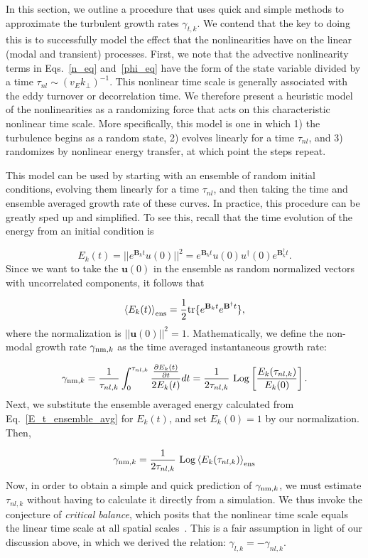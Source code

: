\documentclass[letter,scriptaddress,twocolumn, prl,showkeys]{revtex4}
\def\beq{\begin{equation}}
\def\eeq{\end{equation}}
\newcommand{\pdiff}[2]{\frac{\partial#1}{\partial#2}}
\begin{document}
In this section, we outline a procedure that uses quick and simple methods to approximate the turbulent growth rates $\gamma_{t,k}$.
We contend that the key to doing this is to successfully model the effect that the nonlinearities have on the linear (modal and transient) processes.
First, we note that the advective nonlinearity terms in Eqs.~\ref{n_eq} and~\ref{phi_eq} have the form of the state variable divided by a time $\tau_{nl} \sim (v_E k_\perp)^{-1}$. 
This nonlinear time scale is generally associated with the eddy turnover or decorrelation time. We therefore present a heuristic model of the nonlinearities 
as a randomizing force that acts on this characteristic nonlinear time scale. More specifically, this model is one in which 1) the turbulence begins as a random state, 
2) evolves linearly for a time $\tau_{nl}$, and 3) randomizes by nonlinear energy transfer, at which point the steps repeat.

This model can be used by starting with an ensemble of random initial conditions, evolving them linearly for a time $\tau_{nl}$, and
then taking the time and ensemble averaged growth rate of these curves.
In practice, this procedure can be greatly sped up and simplified. To see this, recall that the time evolution of the energy from an initial condition is

\beq
\label{E_t_from_u0}
E_k(t) = ||e^{\mathbf{B}_k t} u(0)||^2 = e^{\mathbf{B}_k t} u(0) u^{\dagger}(0) e^{\mathbf{B}_k^{\dagger}t}.
\eeq
Since we want to take the $\mathbf{u}(0)$ in the ensemble as random normalized vectors with uncorrelated components, it follows that~\cite{camargo1998}

\beq
\label{E_t_ensemble_avg}
\left< E_k(t) \right>_{{\rm{ens}}} = \frac{1}{2} {\rm{tr}} \{ e^{\mathbf{B}_k t} e^{\mathbf{B}^{\dagger}t} \},
\eeq
where the normalization is $||\mathbf{u}(0)||^2 = 1$. Mathematically, we define the non-modal growth rate $\gamma_{{\rm{nm}},k}$ as the time averaged instantaneous growth rate:

\beq
\label{gamma_nm_calc}
\gamma_{{\rm{nm}},k} = \frac{1}{\tau_{nl,k}} \int_0^{\tau_{nl,k}} \frac{\pdiff{E_k(t)}{t}}{2 E_k(t)} dt = \frac{1}{2 \tau_{nl,k}} \ {\rm{Log}} \left[ \frac{E_k(\tau_{nl,k})}{E_k(0)}\right].
\eeq
Next, we substitute the ensemble averaged energy calculated from Eq.~\ref{E_t_ensemble_avg} for $E_k(t)$, and set $E_k(0) = 1$ by our normalization. Then,

\beq
\label{gamma_nm}
\gamma_{{\rm{nm}},k} = \frac{1}{2 \tau_{nl,k}} \ {\rm{Log}} \left<  E_k(\tau_{nl,k}) \right>_{\rm{ens}}
\eeq
Now, in order to obtain a simple and quick prediction of $\gamma_{{\rm{nm}},k}$, we must estimate $\tau_{nl,k}$ without having to calculate it directly from a simulation. 
We thus invoke the conjecture of \emph{critical balance}, which posits that the nonlinear time scale equals the linear time scale at all spatial scales~\cite{schekochihin2012}. This is a fair
assumption in light of our discussion above, in which we derived the relation: $\gamma_{l,k} = - \gamma_{nl,k}$.
\end{document}
